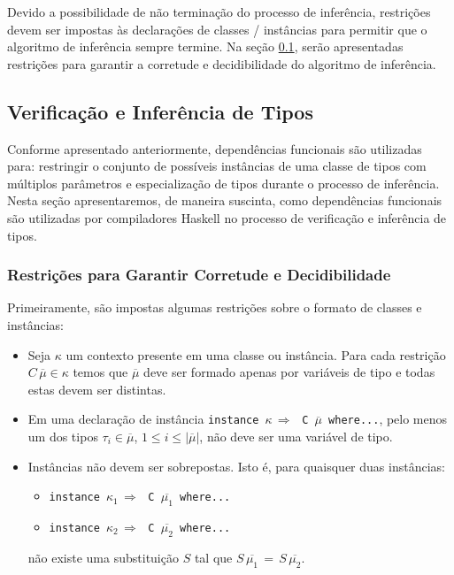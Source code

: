Devido a possibilidade de n\~ao termina\c{c}\~ao do processo de infer\^encia, restri\c{c}\~oes devem ser impostas 
\`as declara\c{c}\~oes de classes / inst\^ancias para permitir que o algoritmo de infer\^encia sempre termine.
Na se\c{c}\~ao \ref{inffundeps}, ser\~ao apresentadas restri\c{c}\~oes para garantir a corretude e decidibilidade 
do algoritmo de infer\^encia.     

\subsection{Verifica\c{c}\~ao e Infer\^encia de Tipos}\label{inffundeps}

Conforme apresentado anteriormente, depend\^encias funcionais s\~ao utilizadas para: restringir o conjunto de 
poss\'iveis inst\^ancias de uma classe de tipos com m\'ultiplos par\^ametros e especializa\c{c}\~ao de tipos
durante o processo de infer\^encia. Nesta se\c{c}\~ao apresentaremos, de maneira suscinta, como depend\^encias
funcionais s\~ao utilizadas por compiladores Haskell no processo de verifica\c{c}\~ao e infer\^encia de tipos.

\subsubsection{Restri\c{c}\~oes para Garantir Corretude e Decidibilidade}

Primeiramente, s\~ao impostas algumas restri\c{c}\~oes sobre o formato de classes e
inst\^ancias:
\begin{itemize}
	\item Seja $\kappa$ um contexto presente em uma classe ou inst\^ancia. Para cada restri\c{c}\~ao 
	$C\,\overline{\mu}\in\kappa$ temos que $\overline{\mu}$ deve ser formado apenas por vari\'aveis de tipo e 
	todas estas devem ser distintas.
	\item Em uma declara\c{c}\~ao de inst\^ancia \texttt{instance $\kappa\,\Rightarrow\,$ C $\overline{\mu}$ where...}, 
	      pelo menos um dos tipos $\tau_{i}\in\overline{\mu}$, $1\leq i\leq |\overline{\mu}|$, 
	      n\~ao deve ser uma vari\'avel de tipo.
	\item Inst\^ancias n\~ao devem ser sobrepostas. Isto \'e, para quaisquer duas inst\^ancias:
	      \begin{itemize}
	      	\item[\ ] \texttt{instance $\kappa_{1}\,\Rightarrow\,$ C $\overline{\mu_{1}}$ where...}
	      	\item[\ ] \texttt{instance $\kappa_{2}\,\Rightarrow\,$ C $\overline{\mu_{2}}$ where...}
	      \end{itemize}
	      n\~ao existe uma substitui\c{c}\~ao $S$ tal que $S\,\overline{\mu_{1}}\,=\,S\,\overline{\mu_{2}}$.
\end{itemize}

